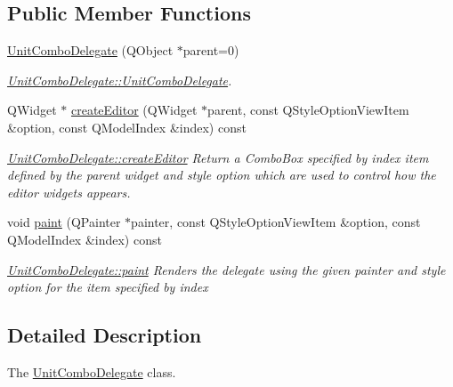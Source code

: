 \subsection*{Public Member Functions}
\begin{DoxyCompactItemize}
\item 
\hyperlink{classGui_1_1Widgets_1_1Delegates_1_1UnitComboDelegate_afd1dc5362c4ed8263354e80337d9958a}{Unit\-Combo\-Delegate} (Q\-Object $\ast$parent=0)
\begin{DoxyCompactList}\small\item\em \hyperlink{classGui_1_1Widgets_1_1Delegates_1_1UnitComboDelegate_afd1dc5362c4ed8263354e80337d9958a}{Unit\-Combo\-Delegate\-::\-Unit\-Combo\-Delegate}. \end{DoxyCompactList}\item 
Q\-Widget $\ast$ \hyperlink{classGui_1_1Widgets_1_1Delegates_1_1UnitComboDelegate_a246f92146bdf89200867629b68e3a86a}{create\-Editor} (Q\-Widget $\ast$parent, const Q\-Style\-Option\-View\-Item \&option, const Q\-Model\-Index \&index) const 
\begin{DoxyCompactList}\small\item\em \hyperlink{classGui_1_1Widgets_1_1Delegates_1_1UnitComboDelegate_a246f92146bdf89200867629b68e3a86a}{Unit\-Combo\-Delegate\-::create\-Editor} Return a Combo\-Box specified by {\itshape index} item defined by the {\itshape parent} widget and style {\itshape option} which are used to control how the editor widgets appears. \end{DoxyCompactList}\item 
void \hyperlink{classGui_1_1Widgets_1_1Delegates_1_1UnitComboDelegate_a2efed5aa3b9bde3cd80e9518cde00e60}{paint} (Q\-Painter $\ast$painter, const Q\-Style\-Option\-View\-Item \&option, const Q\-Model\-Index \&index) const 
\begin{DoxyCompactList}\small\item\em \hyperlink{classGui_1_1Widgets_1_1Delegates_1_1UnitComboDelegate_a2efed5aa3b9bde3cd80e9518cde00e60}{Unit\-Combo\-Delegate\-::paint} Renders the delegate using the given {\itshape painter} and style {\itshape option} for the item specified by {\itshape index} \end{DoxyCompactList}\end{DoxyCompactItemize}


\subsection{Detailed Description}
The \hyperlink{classGui_1_1Widgets_1_1Delegates_1_1UnitComboDelegate}{Unit\-Combo\-Delegate} class. 

